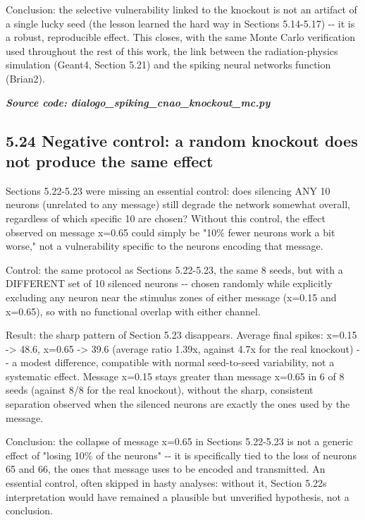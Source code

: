 \documentclass[
  english,
]{article}
\begin{document}
Conclusion: the selective vulnerability linked to the knockout is not an artifact of a single lucky seed (the lesson learned the hard way in Sections 5.14-5.17) -\/- it is a robust, reproducible effect. This closes, with the same Monte Carlo verification used throughout the rest of this work, the link between the radiation-physics simulation (Geant4, Section 5.21) and the spiking neural network\textquotesingle s function (Brian2).

\textit{\textbf{Source code: dialogo\_\allowbreak{}spiking\_\allowbreak{}cnao\_\allowbreak{}knockout\_\allowbreak{}mc.py}}


\subsection{5.24 Negative control: a random knockout does not produce the same effect}\label{negative-control-a-random-knockout-does-not-produce-the-same-effect}

Sections 5.22-5.23 were missing an essential control: does silencing ANY 10 neurons (unrelated to any message) still degrade the network somewhat overall, regardless of which specific 10 are chosen? Without this control, the effect observed on message x=0.65 could simply be "10\% fewer neurons work a bit worse," not a vulnerability specific to the neurons encoding that message.

Control: the same protocol as Sections 5.22-5.23, the same 8 seeds, but with a DIFFERENT set of 10 silenced neurons -\/- chosen randomly while explicitly excluding any neuron near the stimulus zones of either message (x=0.15 and x=0.65), so with no functional overlap with either channel.

Result: the sharp pattern of Section 5.23 disappears. Average final spikes: x=0.15 -\textgreater{} 48.6, x=0.65 -\textgreater{} 39.6 (average ratio 1.39x, against 4.7x for the real knockout) -\/- a modest difference, compatible with normal seed-to-seed variability, not a systematic effect. Message x=0.15 stays greater than message x=0.65 in 6 of 8 seeds (against 8/8 for the real knockout), without the sharp, consistent separation observed when the silenced neurons are exactly the ones used by the message.

Conclusion: the collapse of message x=0.65 in Sections 5.22-5.23 is not a generic effect of "losing 10\% of the neurons" -\/- it is specifically tied to the loss of neurons 65 and 66, the ones that message uses to be encoded and transmitted. An essential control, often skipped in hasty analyses: without it, Section 5.22\textquotesingle s interpretation would have remained a plausible but unverified hypothesis, not a conclusion.
\end{document}
